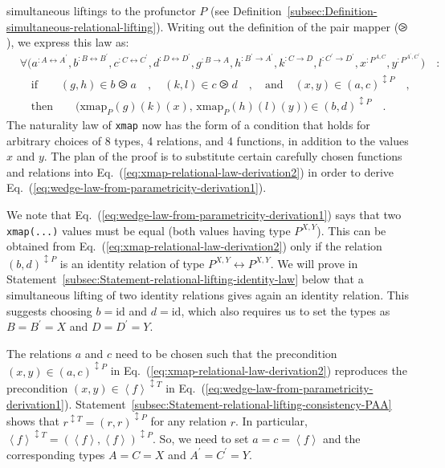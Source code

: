 simultaneous liftings to the profunctor $P$ (see Definition~\ref{subsec:Definition-simultaneous-relational-lifting}).
Writing out the definition of the pair mapper ($\ogreaterthan$),
we express this law as:
\begin{align}
 & \forall\big(a^{:A\leftrightarrow A^{\prime}},b^{:B\leftrightarrow B^{\prime}},c^{:C\leftrightarrow C^{\prime}},d^{:D\leftrightarrow D^{\prime}},g^{:B\rightarrow A},h^{:B^{\prime}\rightarrow A^{\prime}},k^{:C\rightarrow D},l^{:C^{\prime}\rightarrow D^{\prime}},x^{:P^{A,C}},y^{:P^{A^{\prime},C^{\prime}}}\big)\quad:\nonumber \\
 & \quad\text{if}\quad\quad(g,h)\in b\ogreaterthan a\quad,\quad(k,l)\in c\ogreaterthan d\quad,\quad\text{and}\quad(x,y)\in(a,c)^{\updownarrow P}\quad,\nonumber \\
 & \quad\text{then}\quad\quad\big(\text{xmap}_{P}(g)(k)(x),\,\text{xmap}_{P}(h)(l)(y)\big)\in(b,d)^{\updownarrow P}\quad.\label{eq:xmap-relational-law-derivation2}
\end{align}
The naturality law of \lstinline!xmap! now has the form of a condition
that holds for arbitrary choices of 8 types, 4 relations, and 4 functions,
in addition to the values $x$ and $y$. The plan of the proof is
to substitute certain carefully chosen functions and relations into
Eq.~(\ref{eq:xmap-relational-law-derivation2}) in order to derive
Eq.~(\ref{eq:wedge-law-from-parametricity-derivation1}). 

We note that Eq.~(\ref{eq:wedge-law-from-parametricity-derivation1})
says that two \lstinline!xmap(...)! values must be equal (both values
having type $P^{X,Y}$). This can be obtained from Eq.~(\ref{eq:xmap-relational-law-derivation2})
only if the relation $(b,d)^{\updownarrow P}$ is an identity relation
of type $P^{X,Y}\leftrightarrow P^{X,Y}$. We will prove in Statement~\ref{subsec:Statement-relational-lifting-identity-law}
below that a simultaneous lifting of two identity relations gives
again an identity relation. This suggests choosing $b=\text{id}$
and $d=\text{id}$, which also requires us to set the types as $B=B^{\prime}=X$
and $D=D^{\prime}=Y$.

The relations $a$ and $c$ need to be chosen such that the precondition
$(x,y)\in(a,c)^{\updownarrow P}$ in Eq.~(\ref{eq:xmap-relational-law-derivation2})
reproduces the precondition $(x,y)\in\left<f\right>^{\updownarrow T}$
in Eq.~(\ref{eq:wedge-law-from-parametricity-derivation1}). Statement~\ref{subsec:Statement-relational-lifting-consistency-PAA}
shows that $r^{\updownarrow T}=(r,r)^{\updownarrow P}$ for any relation
$r$. In particular, $\left<f\right>^{\updownarrow T}=(\left<f\right>,\left<f\right>)^{\updownarrow P}$.
So, we need to set $a=c=\left<f\right>$ and the corresponding types
$A=C=X$ and $A^{\prime}=C^{\prime}=Y$.

